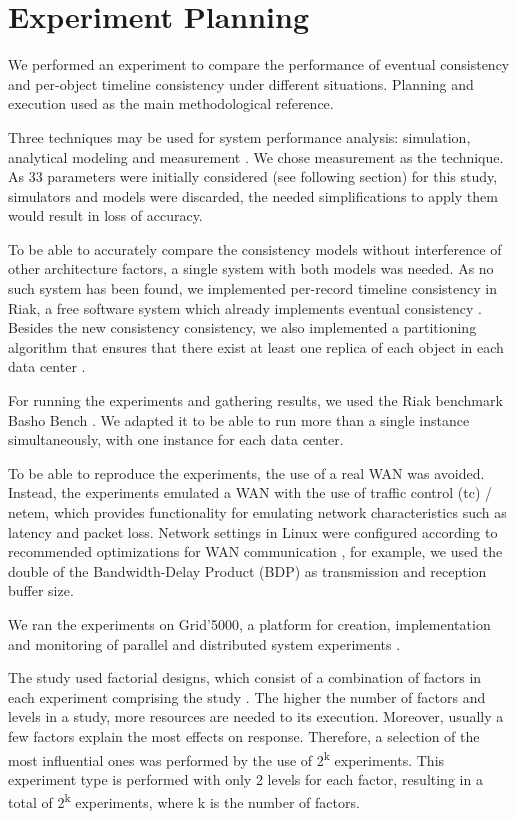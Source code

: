 \documentclass[doublespacing]{bmcart}
\begin{document}
\section{Experiment Planning}

We performed an experiment to compare the performance of eventual consistency and per-object timeline consistency under different situations. Planning and execution used \cite{Jain1991} as the main
methodological reference.

Three techniques may be used for system performance analysis: simulation,
analytical modeling and measurement \cite{Jain1991}. We chose measurement as the technique. As 33 parameters were
initially considered (see following section) for this study, simulators and models were discarded, the needed simplifications to apply them would result in loss of accuracy.

To be able to accurately compare the consistency models without interference of other architecture factors, a single system with both models was needed. As no such system has been found, we implemented per-record timeline consistency
in Riak, a free software system which already implements eventual consistency
\cite{Riak2013}. Besides the new consistency consistency, we also implemented a
partitioning algorithm that ensures that there exist at least one replica of
each object in each data center \cite{DeDiana2013a, DeDiana2013b}.

For running the experiments and gathering results, we used the Riak benchmark Basho Bench \cite{BashoBench2013}. We adapted it to be able to run more than a single instance simultaneously, with one instance for each data center.

To be able to reproduce the experiments, the use of a real WAN was avoided. Instead, the experiments emulated a WAN with the use of traffic control (tc) / netem, which provides
functionality for emulating network characteristics such as latency and packet
loss. Network settings in Linux were configured according to
recommended optimizations for WAN communication \cite{ESnet2012}, for example,
we used the double of the Bandwidth-Delay Product (BDP) as transmission and
reception buffer size.

We ran the experiments on Grid'5000, a platform for creation, implementation
and monitoring of parallel and distributed system experiments
\cite{Grid50002013}.

The study used factorial designs, which consist of a combination of factors in
each experiment comprising the study \cite{Jain1991}. The higher the number of
factors and levels in a study, more resources are needed to its execution.
Moreover, usually a few factors explain the most effects on response. Therefore,
a selection of the most influential ones was performed by the use of
2\textsuperscript{k} experiments. This experiment type is performed with only 2
levels for each factor, resulting in a total of 2\textsuperscript{k} experiments, where k is
the number of factors.
\end{document}
